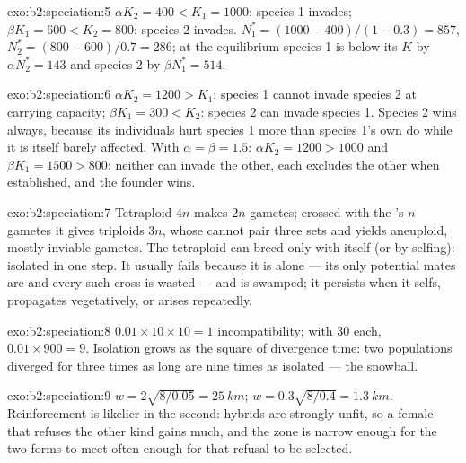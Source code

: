\begin{solution}{exo:b2:speciation:5}
$\alpha K_2 = 400 < K_1 = 1000$: species 1 invades; $\beta K_1 = 600
< K_2 = 800$: species 2 invades. $N_1^{*} = (1000 - 400)/(1 - 0.3) =
857$, $N_2^{*} = (800 - 600)/0.7 = 286$; at the equilibrium species
1 is below its $K$ by $\alpha N_2^{*} = 143$ and species 2 by $\beta
N_1^{*} = 514$.
\end{solution}

\begin{solution}{exo:b2:speciation:6}
$\alpha K_2 = 1200 > K_1$: species 1 cannot invade species 2 at
carrying capacity; $\beta K_1 = 300 < K_2$: species 2 can invade
species 1. Species 2 wins always, because its individuals hurt
species 1 more than species 1's own do while it is itself barely
affected. With $\alpha = \beta = 1.5$: $\alpha K_2 = 1200 > 1000$
and $\beta K_1 = 1500 > 800$: neither can invade the other, each
excludes the other when established, and the founder wins.
\end{solution}

\begin{solution}{exo:b2:speciation:7}
Tetraploid $4n$ makes $2n$ gametes; crossed with the 's $n$
gametes it gives triploids $3n$, whose  cannot pair three
sets and yields aneuploid, mostly inviable gametes. The
tetraploid can breed only with itself (or by selfing): isolated in
one step. It usually fails because it is alone --- its only
potential mates are  and every such cross is wasted ---
and is swamped; it persists when it selfs, propagates vegetatively,
or arises repeatedly.
\end{solution}

\begin{solution}{exo:b2:speciation:8}
$0.01\times 10\times 10 = 1$ incompatibility; with 30 each, $0.01\times
900 = 9$. Isolation grows as the square of divergence time: two
populations diverged for three times as long are nine times as
isolated --- the snowball.
\end{solution}

\begin{solution}{exo:b2:speciation:9}
$w = 2\sqrt{8/0.05} = \qty{25}{km}$; $w = 0.3\sqrt{8/0.4} =
\qty{1.3}{km}$. Reinforcement is likelier in the second: hybrids
are strongly unfit, so a female that refuses the other kind gains
much, and the zone is narrow enough for the two forms to meet often
enough for that refusal to be selected.
\end{solution}


